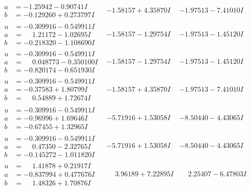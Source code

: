 \documentclass[1p]{elsarticle_modified}
\theoremstyle{definition}
\begin{document}
$$\begin{array}{c|c|c}
\begin{aligned}
a &= -1.25942 - 0.90741 I \\
b &= -0.129260 + 0.273797 I\end{aligned}
 & -1.58157 + 4.35870 I & -1.97513 - 7.41010 I \\ \hline\begin{aligned}
u &= -0.309916 - 0.549911 I \\
a &= \phantom{-}1.21172 - 1.02695 I \\
b &= -0.218320 - 1.108690 I\end{aligned}
 & -1.58157 - 1.29754 I & -1.97513 - 1.45120 I \\ \hline\begin{aligned}
u &= -0.309916 - 0.549911 I \\
a &= \phantom{-}0.048773 - 0.350100 I \\
b &= -0.820174 - 0.651930 I\end{aligned}
 & -1.58157 - 1.29754 I & -1.97513 - 1.45120 I \\ \hline\begin{aligned}
u &= -0.309916 - 0.549911 I \\
a &= -0.37583 + 1.80799 I \\
b &= \phantom{-}0.54889 + 1.72674 I\end{aligned}
 & -1.58157 + 4.35870 I & -1.97513 - 7.41010 I \\ \hline\begin{aligned}
u &= -0.309916 - 0.549911 I \\
a &= -0.96996 + 1.69646 I \\
b &= -0.67455 + 1.32965 I\end{aligned}
 & -5.71916 + 1.53058 I & -8.50440 - 4.43065 I \\ \hline\begin{aligned}
u &= -0.309916 - 0.549911 I \\
a &= \phantom{-}0.47350 - 2.32765 I \\
b &= -0.145272 - 1.011820 I\end{aligned}
 & -5.71916 + 1.53058 I & -8.50440 - 4.43065 I \\ \hline\begin{aligned}
u &= \phantom{-}1.41878 + 0.21917 I \\
a &= -0.837994 + 0.477676 I \\
b &= \phantom{-}1.48326 + 1.70876 I\end{aligned}
 & \phantom{-}3.96189 + 7.22895 I & \phantom{-}2.25407 - 6.47803 I \\ \hline\begin{aligned}

\end{aligned}
\end{array}$$
\end{document}
